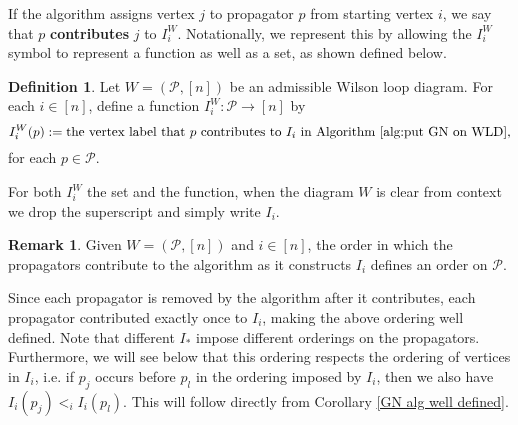 \documentclass[11pt]{article}
\newcommand{\note}{\todo[color=green!40]}
\newcommand{\cP}{\mathcal{P}}
\theoremstyle{remark}
\theoremstyle{definition}
\newtheorem{dfn}[thm]{Definition}
\newtheorem{rmk}[thm]{Remark}
\begin{document}
If the algorithm assigns vertex $j$ to propagator $p$ from starting vertex $i$, we say that $p$ \textbf{contributes} $j$ to $I_i^W$. Notationally, we represent this by allowing the $I_i^W$ symbol to represent a function as well as a set, as shown defined below.
\begin{dfn}\label{def I_i as a function}
Let $W = (\cP, [n])$ be an admissible Wilson loop diagram. For each $i \in [n]$, define a function $I_i^W : \cP \longrightarrow [n]$ by
\[I_i^W(p) := \text{the vertex label that $p$ contributes to $I_i$ in Algorithm~\ref{alg:put GN on WLD},}\]
for each $p \in \cP$. 
\end{dfn}

For both $I_i^W$ the set and the function, when the diagram $W$ is clear from context we drop the superscript and simply write $I_i$.

  
\begin{rmk}
Given $W=(\cP, [n])$ and $i\in [n]$, the order in which the propagators contribute to the algorithm as it constructs $I_i$ defines an order on $\cP$.

Since each propagator is removed by the algorithm after it contributes, each propagator contributed exactly once to $I_i$, making the above ordering well defined.
Note that different $I_*$ impose different orderings on the propagators. Furthermore, we will see below that this ordering respects the ordering of vertices in $I_i$, i.e. if $p_j$ occurs before $p_l$ in the ordering imposed by $I_i$, then we also have $I_i(p_j) <_i I_i(p_l)$. This will follow directly from Corollary \ref{GN alg well defined}.
\end{rmk}
\end{document}
